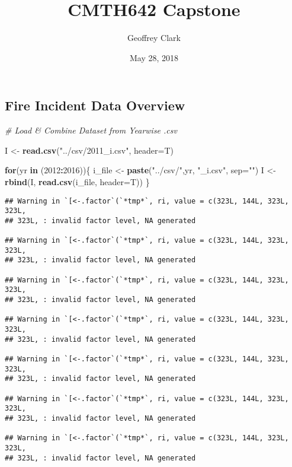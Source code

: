 \documentclass[]{article}
\title{CMTH642 Capstone}
\author{Geoffrey Clark}
\date{May 28, 2018}
\newenvironment{Shaded}{\begin{snugshade}}{\end{snugshade}}
\newcommand{\KeywordTok}[1]{\textcolor[rgb]{0.13,0.29,0.53}{\textbf{#1}}}
\newcommand{\DataTypeTok}[1]{\textcolor[rgb]{0.13,0.29,0.53}{#1}}
\newcommand{\DecValTok}[1]{\textcolor[rgb]{0.00,0.00,0.81}{#1}}
\newcommand{\StringTok}[1]{\textcolor[rgb]{0.31,0.60,0.02}{#1}}
\newcommand{\CommentTok}[1]{\textcolor[rgb]{0.56,0.35,0.01}{\textit{#1}}}
\newcommand{\ControlFlowTok}[1]{\textcolor[rgb]{0.13,0.29,0.53}{\textbf{#1}}}
\newcommand{\OperatorTok}[1]{\textcolor[rgb]{0.81,0.36,0.00}{\textbf{#1}}}
\newcommand{\NormalTok}[1]{#1}
\begin{document}
\maketitle

\subsection{Fire Incident Data
Overview}\label{fire-incident-data-overview}

\begin{Shaded}
\begin{Highlighting}[]
\CommentTok{# Load & Combine Dataset from Yearwise .csv}

\NormalTok{I <-}\StringTok{ }\KeywordTok{read.csv}\NormalTok{(}\StringTok{"../csv/2011_i.csv"}\NormalTok{, }\DataTypeTok{header=}\NormalTok{T)}

\ControlFlowTok{for}\NormalTok{(yr }\ControlFlowTok{in}\NormalTok{ (}\DecValTok{2012}\OperatorTok{:}\DecValTok{2016}\NormalTok{))\{}
\NormalTok{  i_file <-}\StringTok{ }\KeywordTok{paste}\NormalTok{(}\StringTok{"../csv/"}\NormalTok{,yr, }\StringTok{"_i.csv"}\NormalTok{, }\DataTypeTok{sep=}\StringTok{""}\NormalTok{)}
\NormalTok{  I <-}\StringTok{ }\KeywordTok{rbind}\NormalTok{(I, }\KeywordTok{read.csv}\NormalTok{(i_file, }\DataTypeTok{header=}\NormalTok{T))}
\NormalTok{\}}
\end{Highlighting}
\end{Shaded}

\begin{verbatim}
## Warning in `[<-.factor`(`*tmp*`, ri, value = c(323L, 144L, 323L, 323L,
## 323L, : invalid factor level, NA generated

## Warning in `[<-.factor`(`*tmp*`, ri, value = c(323L, 144L, 323L, 323L,
## 323L, : invalid factor level, NA generated

## Warning in `[<-.factor`(`*tmp*`, ri, value = c(323L, 144L, 323L, 323L,
## 323L, : invalid factor level, NA generated

## Warning in `[<-.factor`(`*tmp*`, ri, value = c(323L, 144L, 323L, 323L,
## 323L, : invalid factor level, NA generated

## Warning in `[<-.factor`(`*tmp*`, ri, value = c(323L, 144L, 323L, 323L,
## 323L, : invalid factor level, NA generated

## Warning in `[<-.factor`(`*tmp*`, ri, value = c(323L, 144L, 323L, 323L,
## 323L, : invalid factor level, NA generated

## Warning in `[<-.factor`(`*tmp*`, ri, value = c(323L, 144L, 323L, 323L,
## 323L, : invalid factor level, NA generated
\end{verbatim}
\end{document}
